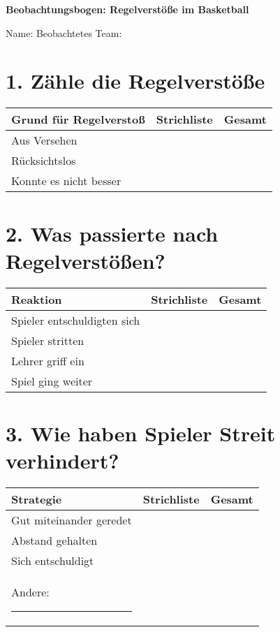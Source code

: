 \documentclass[a4paper,11pt]{article}
\begin{document}
	
	\begin{center}
		\Large\textbf{Beobachtungsbogen: Regelverstöße im Basketball}
	\end{center}
	
	Name: \underline{\hspace{5cm}} Beobachtetes Team: \underline{\hspace{5cm}}
	
	\section*{1. Zähle die Regelverstöße}
	
	\begin{tabular}{|p{4cm}|p{6cm}|p{2cm}|}
		\hline
		Grund für Regelverstoß & Strichliste & Gesamt \\
		\hline
		Aus Versehen & & \\
		\hline
		Rücksichtslos & & \\
		\hline
		Konnte es nicht besser & & \\
		\hline
	\end{tabular}
	
	\section*{2. Was passierte nach Regelverstößen?}
	
	\begin{tabular}{|p{4cm}|p{6cm}|p{2cm}|}
		\hline
		Reaktion & Strichliste & Gesamt \\
		\hline
		Spieler entschuldigten sich & & \\
		\hline
		Spieler stritten & & \\
		\hline
		Lehrer griff ein & & \\
		\hline
		Spiel ging weiter & & \\
		\hline
	\end{tabular}
	
	\section*{3. Wie haben Spieler Streit verhindert?}
	
	\begin{tabular}{|p{4cm}|p{6cm}|p{2cm}|}
		\hline
		Strategie & Strichliste & Gesamt \\
		\hline
		Gut miteinander geredet & & \\
		\hline
		Abstand gehalten & & \\
		\hline
		Sich entschuldigt & & \\
		\hline
		Andere: \rule{3cm}{0.1pt} & & \\
		\hline
	\end{tabular}
	
\end{document}
